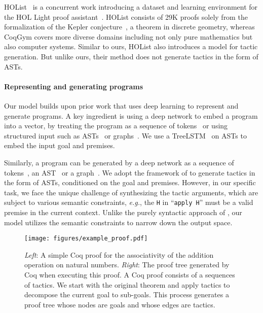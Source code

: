\documentclass{article}
\newcommand{\smallsec}[1]{\vspace{-3mm} \paragraph{#1}}
\newcommand{\datasetname}{CoqGym}
\begin{document}
HOList~\citep{bansal2019holist} is a concurrent work introducing a dataset and learning environment for the HOL Light proof assistant~\citep{harrison1996hol}.
HOList consists of 29K proofs solely from the formalization of the Kepler conjecture~\citep{hales2017formal}, a theorem in discrete geometry, whereas {\datasetname } covers more diverse domains including not only pure mathematics but also computer systems.
Similar to ours, HOList also introduces a model for tactic generation. But unlike ours, their method does not generate tactics in the form of ASTs. 




\smallsec{Representing and generating programs}
Our model builds upon prior work that uses deep learning to represent and generate programs.
A key ingredient is using a deep network to embed a program into a vector, by treating the program as a sequence of tokens~\citep{allamanis2016convolutional} or using structured input such as ASTs~\citep{allamanis2016learning,alon2018code2vec} or graphs~\citep{allamanis2017learning}.
We use a TreeLSTM~\citep{tai2015improved} on ASTs to embed the input goal and premises.

Similarly, a program can be generated by a deep network as a sequence of tokens~\citep{hindle2012naturalness}, an AST~\citep{parisotto2016neuro} or a graph~\citep{brockschmidt2018generative}.
We adopt the framework of \citet{yin2017syntactic} to generate tactics in the form of ASTs, conditioned on the goal and premises.
However, in our specific task, we face the unique challenge of synthesizing the tactic arguments, which are subject to various semantic constraints, \textit{e.g.}, the \texttt{H} in ``\texttt{apply H}'' must be a valid premise in the current context.
Unlike the purely syntactic approach of \citet{yin2017syntactic}, our model utilizes the semantic constraints to narrow down the output space.


\begin{figure*}[ht]
\vskip 0.2in
\begin{center}
\vspace{-8mm}
\centerline{\texttt{[image: figures/example\_proof.pdf]}}
\vspace{-3mm}
\caption{\textit{Left}: A simple Coq proof for the associativity of the addition operation on natural numbers. \textit{Right}: The proof tree generated by Coq when executing this proof. A Coq proof consists of a sequences of tactics. We start with the original theorem and apply tactics to decompose the current goal to sub-goals. This process generates a proof tree whose nodes are goals and whose edges are tactics.}
\vspace{-4mm}
\label{fig:example_coq_proof}
\end{center}
\vskip -0.2in
\end{figure*}
\end{document}
